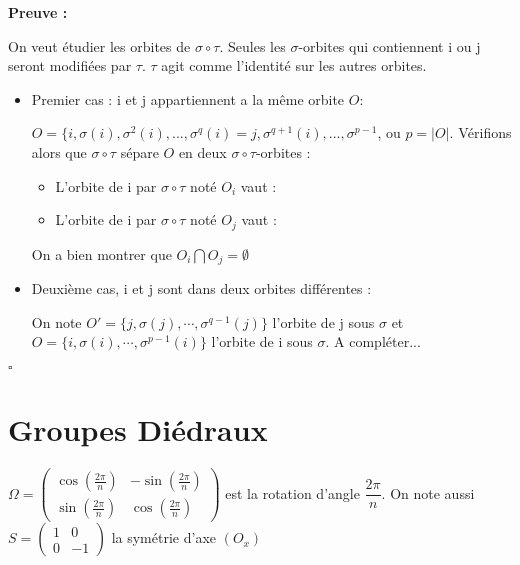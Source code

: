 \documentclass{report}
\renewenvironment{leftbar}{%
  \def\FrameCommand{\vrule width 0.4pt \hspace{10pt}}%
  \MakeFramed {\advance\hsize-\width \FrameRestore}}%
 {\endMakeFramed}%
\newenvironment{preuve}{\vspace*{0.5cm}
    \begin{leftbar}
    \noindent\textbf{Preuve :}\par}{
    \begin{flushright}
    $\square$
    \end{flushright}
    \end{leftbar}
}
\newcommand{\dsp}{\displaystyle}
\begin{document}
\begin{preuve}
On veut étudier les orbites de $\sigma\circ\tau$. Seules les $\sigma$-orbites qui contiennent i ou j seront modifiées par $\tau$. $\tau$ agit comme l'identité sur les autres orbites.
\begin{itemize}[label=$\bullet$]
\item Premier cas : i et j appartiennent a la même orbite $O$: \par
	\noindent$O = \{i,\sigma(i),\sigma^2(i),...,\sigma^q(i)=j,\sigma^{q+1}(i),...,\sigma^{p-1}$, ou $p = |O|$. Vérifions alors que $\sigma\circ\tau$ sépare $O$ en deux $\sigma\circ\tau$-orbites :
	\begin{itemize}
		\item L'orbite de i par $\sigma\circ\tau$ noté $O_{i}$ vaut : 
		\item L'orbite de i par $\sigma\circ\tau$ noté $O_{j}$ vaut : 
			\begin{center}
				\scalebox{0.60}{%
    				\begin{minipage}{\textwidth}
        				
    				\end{minipage}
				}
			\end{center}
	\end{itemize}
	On a bien montrer que $O_{i}\bigcap O_{j}=\emptyset$
\item Deuxième cas, i et j sont dans deux orbites différentes :\par 
\noindent On note $O' = \{j,\sigma(j),\cdots,\sigma^{q-1}(j) \}$  l'orbite de j sous $\sigma$ et $O = \{i,\sigma(i),\cdots,\sigma^{p-1}(i) \}$ l'orbite de i sous $\sigma$. A compléter...
\begin{center}
\scalebox{0.60}{%
    \begin{minipage}{\textwidth}
        
    \end{minipage}
}
\end{center}
\end{itemize}
\end{preuve}


\section{Groupes Diédraux}

$\dsp\Omega=
\begin{pmatrix}
\cos\left( \frac{2\pi}{n}\right) & -\sin\left( \frac{2\pi}{n}\right)\\
\sin\left( \frac{2\pi}{n}\right) & \cos\left( \frac{2\pi}{n}\right)
\end{pmatrix}$  est la rotation d'angle $ \dfrac{2\pi}{n}$. On note aussi $S=\begin{pmatrix}
1&0\\
0&-1
\end{pmatrix}$ la symétrie d'axe $(O_{x})$
\end{document}
